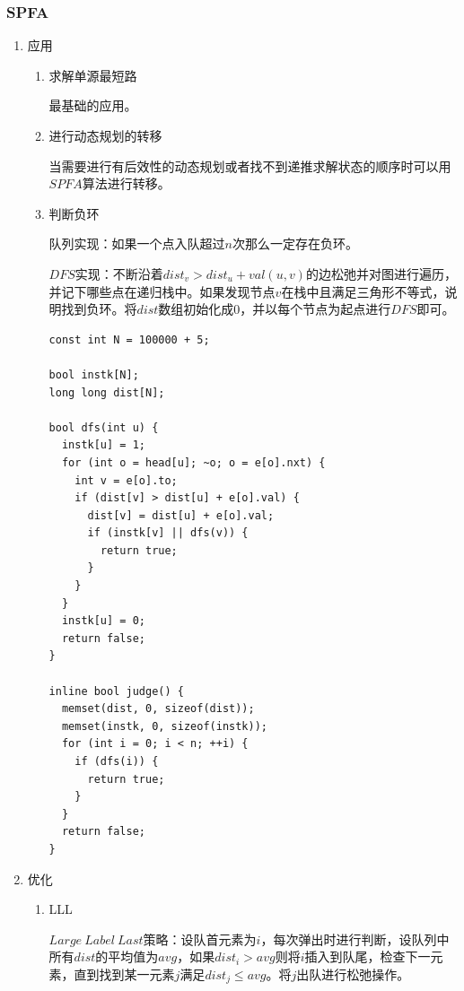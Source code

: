 \documentclass[11pt]{article}
\begin{document}
\subsubsection{SPFA}
\label{sec-2-6-2}
\begin{enumerate}
\item 应用
\label{sec-2-6-2-1}

\begin{enumerate}
\item 求解单源最短路
\label{sec-2-6-2-1-1}

最基础的应用。

\item 进行动态规划的转移
\label{sec-2-6-2-1-2}

当需要进行有后效性的动态规划或者找不到递推求解状态的顺序时可以用\(SPFA\)算法进行转移。

\item 判断负环
\label{sec-2-6-2-1-3}

队列实现：如果一个点入队超过\(n\)次那么一定存在负环。

\(DFS\)实现：不断沿着\(dist_v>dist_u+val(u,v)\)的边松弛并对图进行遍历，并记下哪些点在递归栈中。如果发现节点\(v\)在栈中且满足三角形不等式，说明找到负环。将\(dist\)数组初始化成\(0\)，并以每个节点为起点进行\(DFS\)即可。

\begin{verbatim}
const int N = 100000 + 5;

bool instk[N];
long long dist[N];

bool dfs(int u) {
  instk[u] = 1;
  for (int o = head[u]; ~o; o = e[o].nxt) {
    int v = e[o].to;
    if (dist[v] > dist[u] + e[o].val) {
      dist[v] = dist[u] + e[o].val;
      if (instk[v] || dfs(v)) {
        return true;
      }
    }
  }
  instk[u] = 0;
  return false;
}

inline bool judge() {
  memset(dist, 0, sizeof(dist));
  memset(instk, 0, sizeof(instk));
  for (int i = 0; i < n; ++i) {
    if (dfs(i)) {
      return true;
    }
  }
  return false;
}
\end{verbatim}
\end{enumerate}

\item 优化
\label{sec-2-6-2-2}
\begin{enumerate}
\item LLL
\label{sec-2-6-2-2-1}

\(Large\ Label\ Last\)策略：设队首元素为\(i\)，每次弹出时进行判断，设队列中所有\(dist\)的平均值为\(avg\)，如果\(dist_i>avg\)则将\(i\)插入到队尾，检查下一元素，直到找到某一元素\(j\)满足\(dist_j \leq avg\)。将\(j\)出队进行松弛操作。


\end{enumerate}
\end{enumerate}
\end{document}
